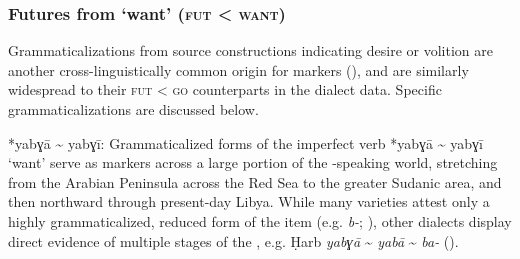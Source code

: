 \documentclass[output=paper]{langsci/langscibook}
\begin{document}
\subsubsection{Futures from ‘want’ (\textsc{fut} < \textsc{want})}\largerpage

Grammaticalizations from source constructions indicating desire or volition are another cross-linguistically common origin for   markers (\citealt{Bybee1994,HeineKuteva2002}), and are similarly widespread to their \textsc{fut} < \textsc{go} counterparts in the  dialect data. Specific grammaticalizations are discussed below.

\begin{altdescription}
\item[*{yabɣā {\textasciitilde} yabɣī}:]
Grammaticalized forms of the imperfect verb *{yabɣā {\textasciitilde} yabɣī} ‘want’ serve as  markers across a large portion of the -speak\-ing world, stretching from the Arabian Peninsula across the Red Sea to the greater Sudanic area, and then northward through present-day Libya. While many  varieties attest only a highly grammaticalized, reduced form of the item (e.g.  \textit{b-}; \citealt{Qafisheh1977}), other dialects display direct evidence of multiple stages of the , e.g. Ḥarb \textit{yabɣā} {\textasciitilde} \textit{yabā} {\textasciitilde} \textit{ba-} (\citealt{Il-Hazmy1975}).


\end{altdescription}
\end{document}
